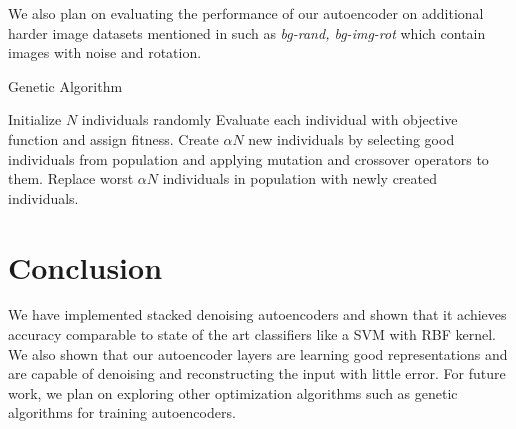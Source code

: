 \documentclass[conference]{IEEEtran}
\begin{document}
We also plan on evaluating the performance of our autoencoder on additional harder image datasets mentioned in \cite{vincent2010stacked} such as \textit{bg-rand, bg-img-rot} which contain images with noise and rotation. 

\begin{algorithm}[h]
\caption{Genetic Algorithm}
\label{alg:genetic}
\begin{algorithmic}
\STATE Initialize $N$ individuals randomly
	\STATE Evaluate each individual with objective function and assign fitness.
	\STATE Create $\alpha N$ new individuals by selecting good individuals from population and applying mutation and crossover operators to them.
	\STATE Replace worst $\alpha N$ individuals in population with newly created individuals.
\ENDFOR
\end{algorithmic}
\end{algorithm}

\section{Conclusion}
We have implemented stacked denoising autoencoders and shown that it achieves accuracy comparable to state of the art classifiers like a SVM with RBF kernel. We also shown that our autoencoder layers are learning good representations and are capable of denoising and reconstructing the input with little error. For future work, we plan on exploring other optimization algorithms such as genetic algorithms for training autoencoders. 



\end{document}

